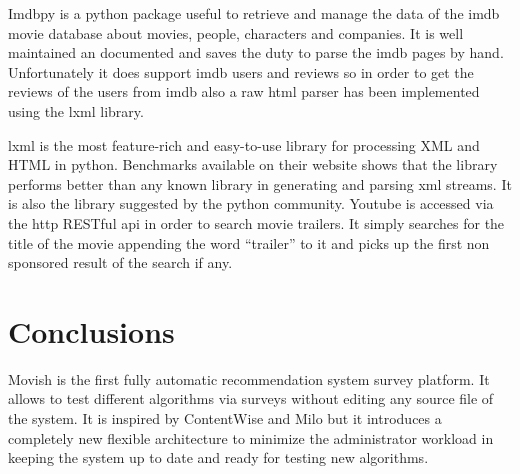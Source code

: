 Imdbpy is a python package useful to retrieve and manage the data of the imdb movie database about movies, people, characters and companies. It is well maintained an documented and saves the duty to parse the imdb pages by hand. Unfortunately it does support imdb users and reviews so in order to get the reviews of the users from imdb also a raw html parser has been implemented using the lxml library.

lxml is the most feature-rich and easy-to-use library for processing XML and HTML in python. Benchmarks available on their website shows that the library performs better than any known library in generating and parsing xml streams. It is also the library suggested by the python community.
Youtube is accessed via the http RESTful api in order to search movie trailers. It simply searches for the title of the movie appending the word ``trailer'' to it and picks up the first non sponsored result of the search if any.

\section{Conclusions}
\label{sec:movish_conclusions}

Movish is the first fully automatic recommendation system survey platform. It allows to test different algorithms via surveys without editing any source file of the system. It is inspired by ContentWise and Milo but it introduces a completely new flexible architecture to minimize the administrator workload in keeping the system up to date and ready for testing new algorithms.  

\acresetall